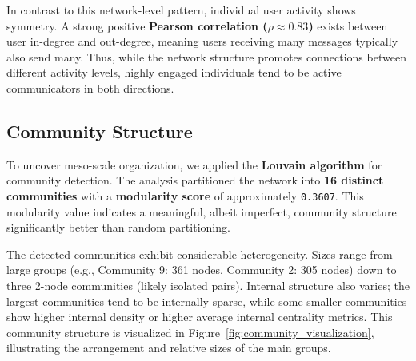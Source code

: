 In contrast to this network-level pattern, individual user activity shows symmetry. A strong positive \textbf{Pearson correlation ($\rho \approx 0.83$)} exists between user in-degree and out-degree, meaning users receiving many messages typically also send many. Thus, while the network structure promotes connections between different activity levels, highly engaged individuals tend to be active communicators in both directions.



\subsection{Community Structure}
\label{sec:community_structure}

To uncover meso-scale organization, we applied the \textbf{Louvain algorithm} for community detection. The analysis partitioned the network into \textbf{16 distinct communities} with a \textbf{modularity score} of approximately \texttt{0.3607}. This modularity value indicates a meaningful, albeit imperfect, community structure significantly better than random partitioning.

The detected communities exhibit considerable heterogeneity. Sizes range from large groups (e.g., Community 9: 361 nodes, Community 2: 305 nodes) down to three 2-node communities (likely isolated pairs). Internal structure also varies; the largest communities tend to be internally sparse, while some smaller communities show higher internal density or higher average internal centrality metrics. This community structure is visualized in Figure~\ref{fig:community_visualization}, illustrating the arrangement and relative sizes of the main groups.


